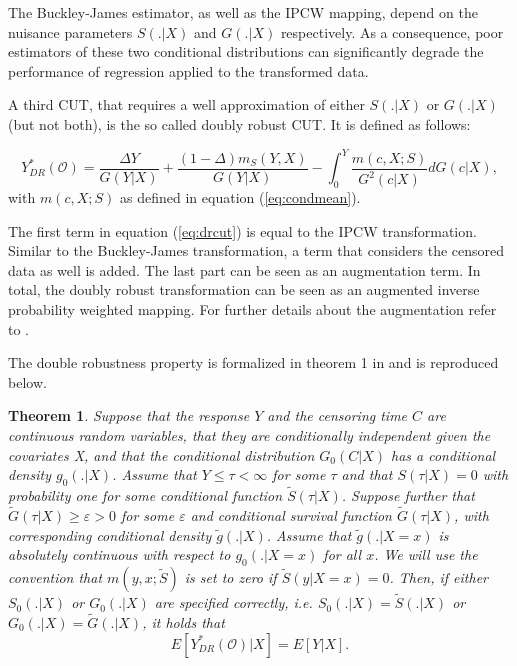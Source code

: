 \documentclass[12pt, a4paper]{article}
\theoremstyle{definition}
\theoremstyle{plain}
\newtheorem{Theorem}{Theorem}[section]
\numberwithin{equation}{section}
\numberwithin{figure}{section}
\numberwithin{table}{section}
\begin{document}
	\citet*{drcut}
	
	The Buckley-James estimator, as well as the IPCW mapping, depend on the nuisance parameters $S(. \vert X)$ and $G(.\vert X)$ respectively.
	As a consequence, poor estimators of these two conditional distributions can significantly degrade the performance of regression applied to the transformed data.
	
	A third CUT, that requires a well approximation of either  $S(. \vert X)$ or $G(.\vert X)$ (but not both), is the so called doubly robust CUT.
	It is defined as follows:
	
	\begin{equation}\label{eq:drcut}
	Y_{DR}^* (\mathcal{O}) = \frac{\Delta Y}{G(Y\vert X)} + \frac{(1-\Delta)m_S(Y,X)}{G(Y \vert X)} - \int_{0}^{Y} \frac{m(c,X;S)}{G^2(c \vert X)} dG(c \vert X),
	\end{equation}
	with $m(c,X;S)$ as defined in equation (\ref{eq:condmean}).
	
	The first term in equation (\ref{eq:drcut}) is equal to the IPCW transformation.
	Similar to the Buckley-James transformation, a term that considers the censored data as well is added.
	The last part can be seen as an augmentation term.
	In total, the doubly robust transformation can be seen as an augmented inverse probability weighted mapping.
	For further details about the augmentation refer to \citet*{bookfailuretime}.
		
	The double robustness property is formalized in theorem 1 in \citet*{drcut} and is reproduced below.
	
	\begin{Theorem}\label{thm:dr}
		Suppose that the response $Y$ and the censoring time $C$ are continuous random variables, that they are conditionally independent given the covariates X, and that the conditional distribution $G_0(C\vert X)$ has a conditional density $g_0(. \vert X)$.
		Assume that $Y \leq \tau < \infty$ for some $\tau$ and that $S(\tau \vert X)=0$ with probability one for some conditional function $\tilde{S}(\tau \vert X)$.
		Suppose further that $\tilde{G}(\tau \vert X)\geq \varepsilon > 0$ for some $\varepsilon$ and conditional survival function $\tilde{G}(\tau \vert X)$, with corresponding conditional density $\tilde{g}(.\vert X)$.
		Assume that $\tilde{g}(.\vert X=x)$ is absolutely continuous with respect to $g_0(.\vert X=x)$ for all $x$.
		We will use the convention that $m(y,x;\tilde{S})$ is set to zero if $\tilde{S}(y \vert X=x)=0$.
		Then, if either $S_0(.\vert X)$ or $G_0(.\vert X)$ are specified correctly, i.e. $S_0(.\vert X)=\tilde{S}(. \vert X)$ or $G_0(.\vert X)=\tilde{G}(. \vert X)$, it holds that
		\begin{equation*}
		E[Y_{DR}^*(\mathcal{O})\vert X] = E[Y \vert X].
		\end{equation*}
	\end{Theorem}
\end{document}
